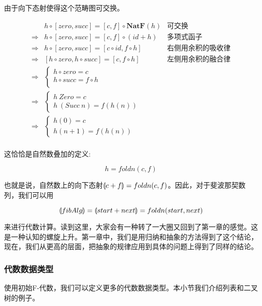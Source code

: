 \documentclass{article}
\begin{document}
由于向下态射使得这个范畴图可交换。

\[
\begin{array}{rll}
            & h \circ [zero, succ] = [c, f] \circ \mathbf{NatF}(h) & \text{可交换} \\
\Rightarrow & h \circ [zero, succ] = [c, f] \circ (id + h) & \text{多项式函子} \\
\Rightarrow & h \circ [zero, succ] = [c \circ id, f \circ h] & \text{右侧用余积的吸收律} \\
\Rightarrow & [h \circ zero, h \circ succ] = [c, f \circ h] & \text{左侧用余积的融合律} \\
\Rightarrow &
  \begin{cases}
    h \circ zero = c \\
    h \circ succ = f \circ h \\
  \end{cases} & \\
\Rightarrow &
  \begin{cases}
    h\ Zero = c \\
    h\ (Succ\ n) = f(h(n))
  \end{cases} & \\
\Rightarrow &
  \begin{cases}
    h(0) = c \\
    h(n + 1) = f(h(n))
  \end{cases} & \\
\end{array}
\]

这恰恰是自然数叠加的定义:

\[
  h = foldn(c, f)
\]

也就是说，自然数上的向下态射$\llparenthesis c + f \rrparenthesis = foldn(c, f)$。因此，对于斐波那契数列，我们可以用

\[
\llparenthesis fibAlg \rrparenthesis = \llparenthesis start + next \rrparenthesis = foldn(start, next)
\]

来进行代数计算。读到这里，大家会有一种转了一大圈又回到了第一章的感觉。这是一种认知的螺旋上升。第一章中，我们是用归纳和抽象的方法得到了这个结论，现在，我们从更高的层面，把抽象的规律应用到具体的问题上得到了同样的结论。

\subsubsection{代数数据类型}

使用初始F-代数，我们可以定义更多的代数数据类型。本小节我们介绍列表和二叉树的例子。
\end{document}
